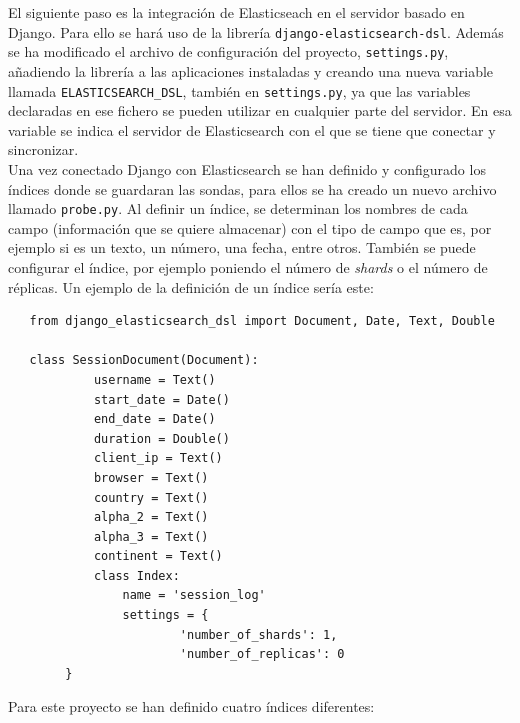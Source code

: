   El siguiente paso es la integración de Elasticseach en el servidor basado en Django. Para ello se hará uso de la librería \texttt{django-elasticsearch-dsl}. Además se ha modificado el archivo de configuración del proyecto, \texttt{settings.py},  añadiendo la librería a las aplicaciones instaladas y creando una nueva variable llamada \texttt{ELASTICSEARCH\_DSL}, también en \texttt{settings.py}, ya que las variables declaradas en ese fichero se pueden utilizar en cualquier parte del servidor. En esa variable se indica el servidor de Elasticsearch con el que se tiene que conectar y sincronizar.\\
  
Una vez conectado Django con Elasticsearch se han definido y configurado los índices donde se guardaran las sondas, para ellos se ha creado un nuevo archivo llamado \texttt{probe.py}. Al definir un índice, se determinan los nombres de cada campo (información que se quiere almacenar) con el tipo de campo que es, por ejemplo si es un texto, un número, una fecha, entre otros. También se puede configurar el índice, por ejemplo poniendo el número de\textit{ shards }o el número de réplicas. Un ejemplo de la definición de un índice sería este: 

\begin{lstlisting}
   from django_elasticsearch_dsl import Document, Date, Text, Double
   
   class SessionDocument(Document):
    		username = Text()
  	  		start_date = Date()
   			end_date = Date()
    		duration = Double()
    		client_ip = Text()
    		browser = Text()
    		country = Text()
    		alpha_2 = Text()
    		alpha_3 = Text()
    		continent = Text()
    		class Index:
        		name = 'session_log'
        		settings = {
            			'number_of_shards': 1,
           				'number_of_replicas': 0
        }
\end{lstlisting} 

Para este proyecto se han definido cuatro índices diferentes:

